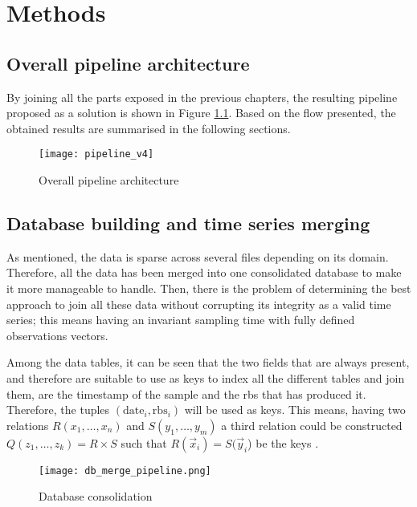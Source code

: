 
\chapter{Methods}
\label{cha:method}

\section{Overall pipeline architecture}

By joining all the parts exposed in the previous chapters, the resulting pipeline proposed as a solution is shown in Figure \ref{fig:sol_pipeline}. Based on the flow presented, the obtained results are summarised in the following sections.

\begin{figure}[H]
	\centering
	\texttt{[image: pipeline\_v4]}
	\caption{Overall pipeline architecture}
	\label{fig:sol_pipeline}
\end{figure}


\section{Database building and time series merging}
\label{sec:db_building}

As mentioned, the data is sparse across several files depending on its domain. Therefore, all the data has been merged into one consolidated database to make it more manageable to handle. Then, there is the problem of determining the best approach to join all these data without corrupting its integrity as a valid time series; this means having an invariant sampling time with fully defined observations vectors.

Among the data tables, it can be seen that the two fields that are always present, and therefore are suitable to use as keys to index all the different tables and join them, are the timestamp of the sample and the \ac{rbs} that has produced it. Therefore, the tuples $(\text{date}_i, \text{rbs}_i)$ will be used as keys. This means, having two relations $R(x_1, \ldots, x_n)$ and $S(y_1,\ldots,y_m)$ a third relation could be constructed $Q(z_1, \ldots, z_k) = R \times S$ such that $R(\vec{x}_i) = S(\vec{y}_i$) be the keys \cite{mishra1992join}.

\begin{figure}[H]
	\centering
	\texttt{[image: db\_merge\_pipeline.png]}
	\caption{Database consolidation}
	\label{fig:db_merge}
\end{figure}

